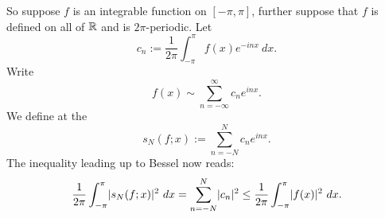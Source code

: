 So suppose $f$ is an integrable function on $[-\pi,\pi]$,
further suppose
that $f$ is defined on all of ${\mathbb{R}}$ and is $2\pi$-periodic.
Let
\begin{equation*}
c_n := 
\frac{1}{2\pi} \int_{-\pi}^\pi
f(x) e^{-inx} ~ dx .
\end{equation*}
Write
\begin{equation*}
f(x) \sim
\sum_{n=-\infty}^\infty c_n e^{inx} .
\end{equation*}
We define at the \emph{}
\begin{equation*}
s_N(f;x) := 
\sum_{n=-N}^N c_n e^{inx} .
\end{equation*}
The inequality leading up to Bessel now reads:
\begin{equation*}
\frac{1}{2\pi} \int_{-\pi}^\pi
\lvert {s_N(f;x)} \rvert^2 ~ dx =
\sum_{n=-N}^N \lvert {c_n} \rvert^2
\leq
\frac{1}{2\pi} \int_{-\pi}^\pi
\lvert {f(x)} \rvert^2
~ dx .
\end{equation*}

